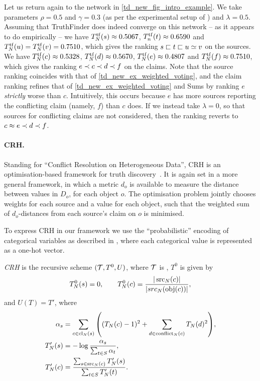 Let us return again to the network in \cref{td_new_fig_intro_example}. We take
parameters $\rho = 0.5$ and $\gamma = 0.3$ (as per the experimental setup of
\textcite{yin2008}) and $\lambda = 0.5$. Assuming that TruthFinder does indeed
converge on this network -- as it appears to do empirically -- we have
$T^{\operatorname{tf}}_N(s) \approx 0.5067$, $T^{\operatorname{tf}}_n(t) \approx 0.6590$ and
$T^{\operatorname{tf}}_N(u) = T^{\operatorname{tf}}_N(v) = 0.7510$, which gives the ranking $s
\sqsubset t \sqsubset u \simeq v$ on the sources. We have $T^{\operatorname{tf}}_N(c) \approx
0.5328$, $T^{\operatorname{tf}}_N(d) \approx 0.5670$, $T^{\operatorname{tf}}_N(e) \approx 0.4807$
and $T^{\operatorname{tf}}_N(f) \approx 0.7510$, which gives the ranking $e \prec c \prec
d \prec f$ on the claims. Note that the source ranking coincides with that of
\cref{td_new_ex_weighted_voting}, and the claim ranking refines that of
\cref{td_new_ex_weighted_voting} and Sums by ranking $e$ \emph{strictly} worse
than $c$. Intuitively, this occurs because $e$ has more sources reporting the
conflicting claim (namely, $f$) than $c$ does. If we instead take $\lambda =
0$, so that sources for conflicting claims are not considered, then the ranking
reverts to $c \approx e \prec d \prec f$.

\paragraph{CRH.} Standing for ``Conflict Resolution on Heterogeneous Data'', CRH
is an optimisation-based framework for truth discovery~\cite{li2016}. It is
again set in a more general framework, in which a metric $d_o$ is available to
measure the distance between values in $D_o$, for each object $o$. The
optimisation problem jointly chooses weights for each source and a value for
each object, such that the weighted sum of $d_o$-distances from each source's
claim on $o$ is minimised.

To express CRH in our framework we use the ``probabilistic'' encoding of
categorical variables as described in \cite[]{li2016},
where each categorical value is represented as a one-hot vector.

\begin{definition}
    \emph{CRH} is the recursive scheme $(\mathcal{T}, T^0, U)$, where $\mathcal{T}$ is
    , $T^0$ is given by
    \[
        T^0_N(s) = 0, \qquad
        T^0_N(c) = \frac{|\operatorname{src}_N(c)|}{|src_N(\operatorname{obj}(c))|},
    \]
    and $U(T) = T'$, where
    \begin{align*}
        \alpha_s &= \sum_{c \in \operatorname{cl}_N(s)}{
            \left(
                (T_N(c) - 1)^2
                +
                \sum_{d \in \operatorname{conflict}_N(c)}{
                    T_N(d)^2
                }
            \right)
        }, \\
        T'_N(s) &= -\log\frac{\alpha_s}{\sum_{t \in S}{\alpha_t}}, \\
        T'_N(c) &=
            \frac{\sum_{s \in \operatorname{src}_N(c)}{T'_N(s)}}{\sum_{t \in S}{T'_N(t)}}.
    \end{align*}
\end{definition}

